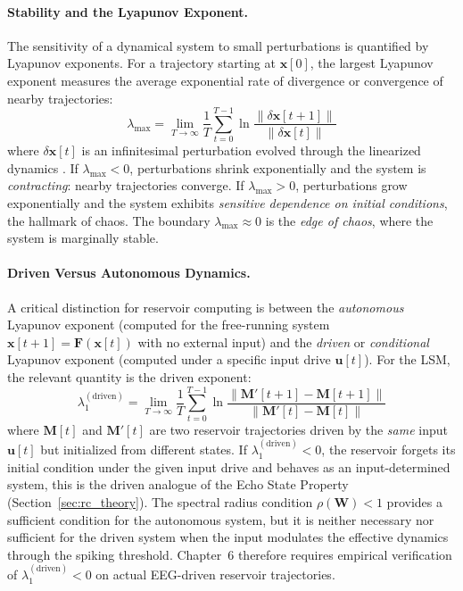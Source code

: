 \paragraph{Stability and the Lyapunov Exponent.}
The sensitivity of a dynamical system to small perturbations is quantified by Lyapunov exponents. For a trajectory starting at $\mathbf{x}[0]$, the largest Lyapunov exponent measures the average exponential rate of divergence or convergence of nearby trajectories:
\begin{equation}
    \lambda_{\max} = \lim_{T \to \infty} \frac{1}{T} \sum_{t=0}^{T-1} \ln \frac{\|\delta \mathbf{x}[t+1]\|}{\|\delta \mathbf{x}[t]\|}
    \label{eq:lyapunov}
\end{equation}
where $\delta \mathbf{x}[t]$ is an infinitesimal perturbation evolved through the linearized dynamics \cite{strogatz_nonlinear_2015}. If $\lambda_{\max} < 0$, perturbations shrink exponentially and the system is \emph{contracting}: nearby trajectories converge. If $\lambda_{\max} > 0$, perturbations grow exponentially and the system exhibits \emph{sensitive dependence on initial conditions}, the hallmark of chaos. The boundary $\lambda_{\max} \approx 0$ is the \emph{edge of chaos}, where the system is marginally stable.

\paragraph{Driven Versus Autonomous Dynamics.}
A critical distinction for reservoir computing is between the \emph{autonomous} Lyapunov exponent (computed for the free-running system $\mathbf{x}[t+1] = \mathbf{F}(\mathbf{x}[t])$ with no external input) and the \emph{driven} or \emph{conditional} Lyapunov exponent (computed under a specific input drive $\mathbf{u}[t]$). For the LSM, the relevant quantity is the driven exponent:
\begin{equation}
    \lambda_1^{(\text{driven})} = \lim_{T \to \infty} \frac{1}{T} \sum_{t=0}^{T-1} \ln \frac{\|\mathbf{M}'[t+1] - \mathbf{M}[t+1]\|}{\|\mathbf{M}'[t] - \mathbf{M}[t]\|}
    \label{eq:driven_lyapunov}
\end{equation}
where $\mathbf{M}[t]$ and $\mathbf{M}'[t]$ are two reservoir trajectories driven by the \emph{same} input $\mathbf{u}[t]$ but initialized from different states. If $\lambda_1^{(\text{driven})} < 0$, the reservoir forgets its initial condition under the given input drive and behaves as an input-determined system, this is the driven analogue of the Echo State Property (Section~\ref{sec:rc_theory}). The spectral radius condition $\rho(\mathbf{W}) < 1$ provides a sufficient condition for the autonomous system, but it is neither necessary nor sufficient for the driven system when the input modulates the effective dynamics through the spiking threshold. Chapter~6 therefore requires empirical verification of $\lambda_1^{(\text{driven})} < 0$ on actual EEG-driven reservoir trajectories.

